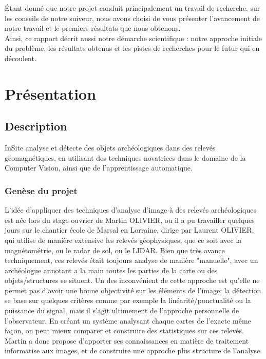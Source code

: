 \documentclass[a4paper, 12pt, titlepage, oneside, french]{article}
\begin{document}
	Étant donné que notre projet conduit principalement un travail de recherche, sur les conseils de notre suiveur, nous avons choisi de vous présenter l'avancement de notre travail et le premiers résultats que nous obtenons. \\
	Ainsi, ce rapport décrit aussi notre démarche scientifique : notre approche initiale du problème, les résultats obtenus et les pistes de recherches pour le futur qui en découlent.
	
	\newpage
\section{Présentation}
	\subsection{Description}%
		InSite analyse et détecte des objets archéologiques dans des relevés géomagnétiques, en utilisant des techniques novatrices dans le domaine de
		la Computer Vision, ainsi que de l'apprentissage automatique.

		\subsubsection{Genèse du projet}
		L'idée d'appliquer des techniques d'analyse d'image à des relevés archéologiques est née lors du stage ouvrier de Martin OLIVIER, ou il a pu travailler quelques jours sur le chantier école de Marsal en Lorraine, dirige par Laurent OLIVIER, qui utilise de manière extensive les relevés géophysiques, que ce soit avec la magnétométrie, ou le radar de sol, ou le LIDAR. Bien que très avance techniquement, ces relevés était toujours analyse de manière "manuelle", avec un archéologue annotant a la main toutes les parties de la carte ou des objets/structures se situent. Un des inconvénient de cette approche est qu'elle ne permet pas d'avoir une bonne objectivité sur les éléments de l'image; la détection se base sur quelques critères comme par exemple la linéarité/ponctualité ou la puissance du signal, mais il s'agit ultimement de l'approche personnelle de l'observateur. En créant un système analysant chaque cartes de l'exacte même façon, on peut mieux comparer et construire des statistiques sur ces relevés. Martin a donc propose d'apporter ses connaissances en matière de traitement informatise aux images, et de construire une approche plus structure de l'analyse.
\end{document}
